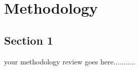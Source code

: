 \chapter{Methodology}  %

\section{\large Section 1} %

 

 

your methodology review goes here........... 